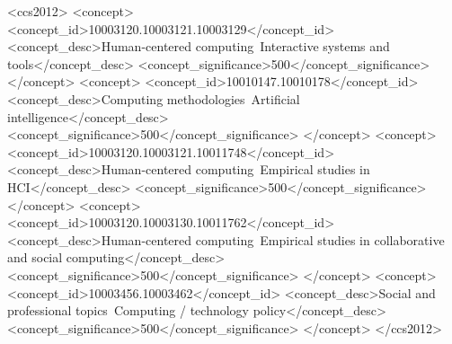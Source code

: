 \documentclass[sigconf]{acmart}
\begin{document}
\author{Alice Qian}
\author{Ziqi Yang}


\author{Ryland Shaw}


\author{Jina Suh}

      
\author{Laura Dabbish}

  
\author{Hong Shen}





  \begin{CCSXML}
<ccs2012>
   <concept>
       <concept_id>10003120.10003121.10003129</concept_id>
       <concept_desc>Human-centered computing~Interactive systems and tools</concept_desc>
       <concept_significance>500</concept_significance>
       </concept>
   <concept>
       <concept_id>10010147.10010178</concept_id>
       <concept_desc>Computing methodologies~Artificial intelligence</concept_desc>
       <concept_significance>500</concept_significance>
       </concept>
   <concept>
       <concept_id>10003120.10003121.10011748</concept_id>
       <concept_desc>Human-centered computing~Empirical studies in HCI</concept_desc>
       <concept_significance>500</concept_significance>
       </concept>
   <concept>
       <concept_id>10003120.10003130.10011762</concept_id>
       <concept_desc>Human-centered computing~Empirical studies in collaborative and social computing</concept_desc>
       <concept_significance>500</concept_significance>
       </concept>
   <concept>
       <concept_id>10003456.10003462</concept_id>
       <concept_desc>Social and professional topics~Computing / technology policy</concept_desc>
       <concept_significance>500</concept_significance>
       </concept>
 </ccs2012>
\end{CCSXML}
\end{document}
